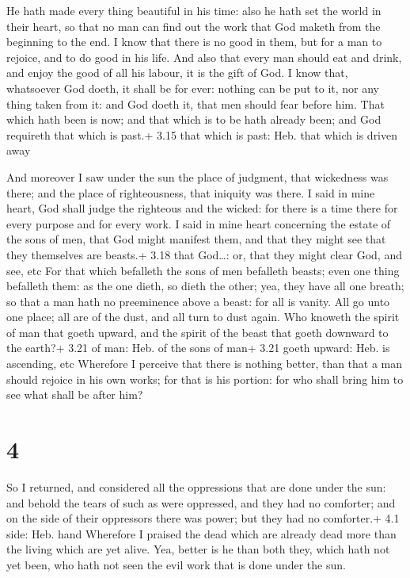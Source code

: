  He hath made every thing beautiful in his time: also he
hath set the world in their heart, so that no man can find out the work
that God maketh from the beginning to the end.  I know that
there is no good in them, but for a man to rejoice, and to do good in
his life.  And also that every man should eat and drink,
and enjoy the good of all his labour, it is the gift of God.
 I know that, whatsoever God doeth, it shall be for ever:
nothing can be put to it, nor any thing taken from it: and God doeth it,
that men should fear before him.  That which hath been is
now; and that which is to be hath already been; and God requireth that
which is past.+ 3.15 that which is past: Heb. that which is driven away

 And moreover I saw under the sun the place of judgment,
that wickedness was there; and the place of righteousness, that iniquity
was there.  I said in mine heart, God shall judge the
righteous and the wicked: for there is a time there for every purpose
and for every work.  I said in mine heart concerning the
estate of the sons of men, that God might manifest them, and that they
might see that they themselves are beasts.+ 3.18 that God\ldots: or,
that they might clear God, and see, etc  For that which
befalleth the sons of men befalleth beasts; even one thing befalleth
them: as the one dieth, so dieth the other; yea, they have all one
breath; so that a man hath no preeminence above a beast: for all is
vanity.  All go unto one place; all are of the dust, and
all turn to dust again.  Who knoweth the spirit of man that
goeth upward, and the spirit of the beast that goeth downward to the
earth?+ 3.21 of man: Heb. of the sons of man+ 3.21 goeth upward: Heb. is
ascending, etc  Wherefore I perceive that there is nothing
better, than that a man should rejoice in his own works; for that is his
portion: for who shall bring him to see what shall be after him?

\hypertarget{section-3}{%
\section{4}\label{section-3}}

 So I returned, and considered all the oppressions that are
done under the sun: and behold the tears of such as were oppressed, and
they had no comforter; and on the side of their oppressors there was
power; but they had no comforter.+ 4.1 side: Heb. hand 
Wherefore I praised the dead which are already dead more than the living
which are yet alive.  Yea, better is he than both they,
which hath not yet been, who hath not seen the evil work that is done
under the sun.

